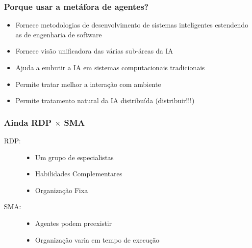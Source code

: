 

\begin{frame} %


\frametitle{Porque usar a metáfora de agentes?}

\begin{itemize}
  \item Fornece metodologias de desenvolvimento de sistemas  inteligentes estendendo as de engenharia de software
   \item Fornece visão unificadora das várias sub-áreas da IA 
  \item  Ajuda a embutir a IA em sistemas computacionais 
tradicionais
  \item  Permite tratar melhor a interação com ambiente 
  \item Permite tratamento natural da IA distribuída (distribuir!!!)
  
\end{itemize}


\end{frame}


\begin{frame} %


\frametitle{Ainda RDP $\times$ SMA }

\begin{block}
  
  \begin{description}
    \item[RDP:] 
    \begin{itemize}
      \item Um grupo de especialistas
      \item Habilidades Complementares
      \item Organização Fixa
    \end{itemize}
    
    \item[SMA:]
    
    \begin{itemize}
      \item Agentes podem preexistir
      \item Organização varia em tempo de execução
    \end{itemize}
     
  \end{description}
   
\end{block}

\end{frame}

